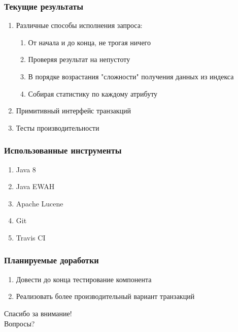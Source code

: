 \documentclass{beamer}
\begin{document}
\begin{frame}\frametitle{Текущие результаты}
    \begin{enumerate}
        \item Различные способы исполнения запроса:
            \begin{enumerate}
                \item От начала и до конца, не трогая ничего
                \item Проверяя результат на непустоту 
                \item В порядке возрастания "сложности" получения данных из индекса
                \item Собирая статистику по каждому атрибуту
            \end{enumerate}
        \item Примитивный интерфейс транзакций
        \item Тесты производительности
    \end{enumerate}
\end{frame}

\begin{frame}\frametitle{Использованные инструменты}
    \begin{enumerate}
        \item Java 8
        \item Java EWAH
        \item Apache Lucene
        \item Git 
        \item Travis CI
    \end{enumerate}
\end{frame}

\begin{frame}\frametitle{Планируемые доработки}
    \begin{enumerate}
        \item Довести до конца тестирование компонента 
        \item Реализовать более производительный вариант транзакций
    \end{enumerate}
\end{frame}

\begin{frame} 
    \begin{center} 
        \Huge Спасибо за внимание! \\ Вопросы? 
    \end{center} 
\end{frame} 
\end{document}
